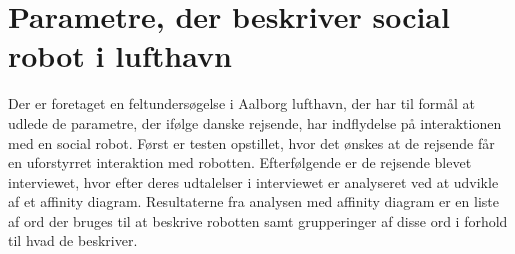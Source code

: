 \chapter*{Parametre, der beskriver social robot i lufthavn}
%
Der er foretaget en feltundersøgelse i Aalborg lufthavn, der har til formål at udlede de parametre, der ifølge danske rejsende, har indflydelse på interaktionen med en social robot. Først er testen opstillet, hvor det ønskes at de rejsende får en uforstyrret interaktion med robotten. Efterfølgende er de rejsende blevet interviewet, hvor efter deres udtalelser i interviewet er analyseret ved at udvikle af et affinity diagram. Resultaterne fra analysen med affinity diagram er en liste af ord der bruges til at beskrive robotten samt grupperinger af disse ord i forhold til hvad de beskriver. 